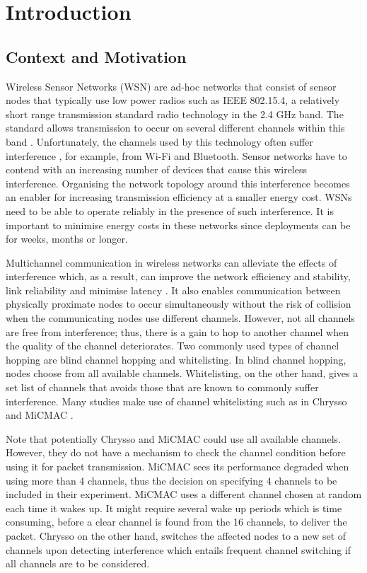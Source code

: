 \chapter{Introduction}
\label{introduction}

\section{Context and Motivation}
Wireless Sensor Networks (WSN) are ad-hoc networks that consist of sensor nodes that typically use low power radios such as IEEE 802.15.4, a relatively short range transmission standard radio technology in the 2.4 GHz band. The standard allows transmission to occur on several different channels within this band \cite{ieee802.15.4}. Unfortunately, the channels used by this technology often suffer interference \cite{interferenceModel, ieeeCompare}, for example, from Wi-Fi \cite{ieee_2012, wu} and Bluetooth. Sensor networks have to contend with an increasing number of devices that cause this wireless interference. Organising the network topology around this interference becomes an enabler for increasing transmission efficiency at a smaller energy cost. WSNs need to be able to operate reliably in the presence of such interference. It is important to minimise energy costs in these networks since deployments can be for weeks, months or longer.

Multichannel communication in wireless networks can alleviate the effects of interference which, as a result, can improve the network efficiency and stability, link reliability and minimise latency \cite{watteyne}. It also enables communication between physically proximate nodes to occur simultaneously without the risk of collision when the communicating nodes use different channels. However, not all channels are free from interference; thus, there is a gain to hop to another channel when the quality of the channel deteriorates. Two commonly used types of channel hopping \cite{watteyne} are blind channel hopping and whitelisting. In blind channel hopping, nodes choose from all available channels. 
Whitelisting, on the other hand, gives a set list of channels that avoids those that are known to commonly suffer interference.
Many studies make use of channel whitelisting such as in Chrysso \cite{chrysso} and MiCMAC \cite{micmac}.

Note that potentially Chrysso and MiCMAC could use all available channels.
However, they do not have a mechanism to check the channel condition before using it for packet transmission. MiCMAC sees its performance degraded when using more than 4 channels, thus the decision on specifying 4 channels to be included in their experiment. 
MiCMAC uses a different channel chosen at random each time it wakes up.
It might require several wake up periods which is time consuming, before a clear channel is found from the 16 channels, to deliver the packet.  
Chrysso on the other hand, switches the affected nodes to a new set of channels upon detecting interference which entails frequent channel switching if all channels are to be considered.

